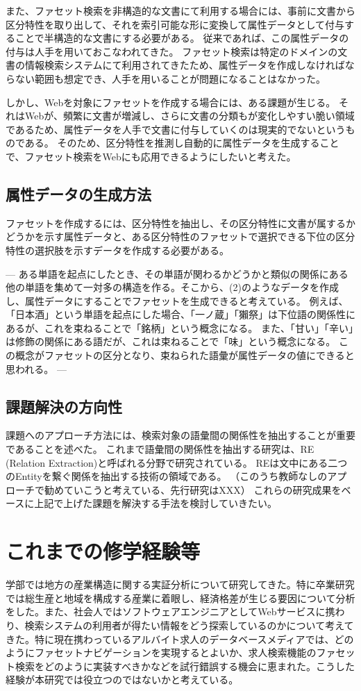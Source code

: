 \documentclass[a4j,10pt, twocolumn]{jarticle} \usepackage[dvipdfmx]{graphicx} \usepackage{amssymb} \usepackage{amsmath}
\begin{document}
  また、ファセット検索を非構造的な文書にて利用する場合には、事前に文書から区分特性を取り出して、それを索引可能な形に変換して属性データとして付与することで半構造的な文書にする必要がある。
  従来であれば、この属性データの付与は人手を用いておこなわれてきた。
  ファセット検索は特定のドメインの文書の情報検索システムにて利用されてきたため、属性データを作成しなければならない範囲も想定でき、人手を用いることが問題になることはなかった。

  しかし、Webを対象にファセットを作成する場合には、ある課題が生じる。
  それはWebが、頻繁に文書が増減し、さらに文書の分類もが変化しやすい脆い領域であるため、属性データを人手で文書に付与していくのは現実的でないというものである。
  そのため、区分特性を推測し自動的に属性データを生成することで、ファセット検索をWebにも応用できるようにしたいと考えた。

\subsection{属性データの生成方法}
ファセットを作成するには、区分特性を抽出し、その区分特性に文書が属するかどうかを示す属性データと、ある区分特性のファセットで選択できる下位の区分特性の選択肢を示すデータを作成する必要がある。

---
ある単語を起点にしたとき、その単語が関わるかどうかと類似の関係にある他の単語を集めて一対多の構造を作る。そこから、(2)のようなデータを作成し、属性データにすることでファセットを生成できると考えている。
  例えば、「日本酒」という単語を起点にした場合、「一ノ蔵」「獺祭」は下位語の関係性にあるが、これを束ねることで「銘柄」という概念になる。
  また、「甘い」「辛い」は修飾の関係にある語だが、これは束ねることで「味」という概念になる。
  この概念がファセットの区分となり、束ねられた語彙が属性データの値にできると思われる。
---

\subsection{課題解決の方向性}
  課題へのアプローチ方法には、検索対象の語彙間の関係性を抽出することが重要であることを述べた。
  これまで語彙間の関係性を抽出する研究は、RE (Relation Extraction)と呼ばれる分野で研究されている。
  REは文中にある二つのEntityを繋ぐ関係を抽出する技術の領域である。
  （このうち教師なしのアプローチで勧めていこうと考えている、先行研究はXXX）
  これらの研究成果をベースに上記で上げた課題を解決する手法を検討していきたい。

\section{これまでの修学経験等}
 学部では地方の産業構造に関する実証分析について研究してきた。特に卒業研究では総生産と地域を構成する産業に着眼し、経済格差が生じる要因について分析をした。また、社会人ではソフトウェアエンジニアとしてWebサービスに携わり、検索システムの利用者が得たい情報をどう探索しているのかについて考えてきた。特に現在携わっているアルバイト求人のデータベースメディアでは、どのようにファセットナビゲーションを実現するとよいか、求人検索機能のファセット検索をどのように実装すべきかなどを試行錯誤する機会に恵まれた。こうした経験が本研究では役立つのではないかと考えている。
\end{document}
